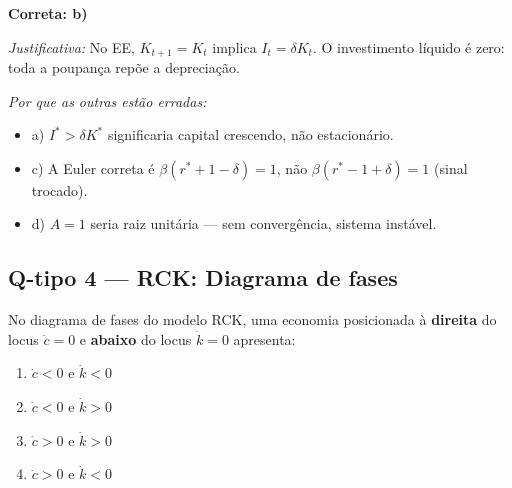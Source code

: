 \documentclass[12pt, a4paper]{article}
\begin{document}
\begin{resultbox}[title={Resposta Q-tipo 3: alternativa b)}]
\textbf{Correta: b)}

\textit{Justificativa:} No EE, $K_{t+1}=K_t$ implica $I_t = \delta K_t$.
O investimento líquido é zero: toda a poupança repõe a depreciação.

\textit{Por que as outras estão erradas:}
\begin{itemize}[leftmargin=1.5em, topsep=2pt, itemsep=2pt]
  \item a) $I^*>\delta K^*$ significaria capital crescendo, não estacionário.
  \item c) A Euler correta é $\beta(r^*+1-\delta)=1$, não $\beta(r^*-1+\delta)=1$
    (sinal trocado).
  \item d) $A=1$ seria raiz unitária --- sem convergência, sistema instável.
\end{itemize}
\end{resultbox}

\bigskip

\subsection*{Q-tipo 4 --- RCK: Diagrama de fases}

No diagrama de fases do modelo RCK, uma economia posicionada à \textbf{direita} do
locus $\dot{c}=0$ e \textbf{abaixo} do locus $\dot{k}=0$ apresenta:

\begin{enumerate}[label=\textbf{\alph*)}, leftmargin=2em, itemsep=4pt]
  \item $\dot{c}<0$ e $\dot{k}<0$
  \item $\dot{c}<0$ e $\dot{k}>0$
  \item $\dot{c}>0$ e $\dot{k}>0$
  \item $\dot{c}>0$ e $\dot{k}<0$
\end{enumerate}
\end{document}
